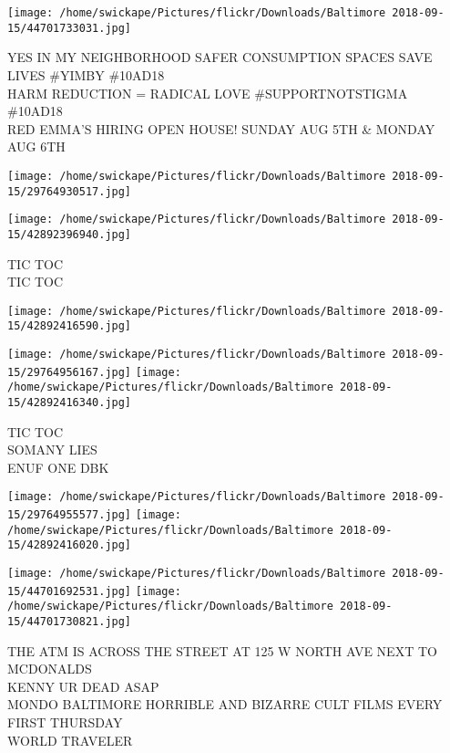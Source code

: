 \documentclass[10pt,letterpaper]{article}
\begin{document}
\texttt{[image: /home/swickape/Pictures/flickr/Downloads/Baltimore 2018-09-15/44701733031.jpg]}

YES IN MY NEIGHBORHOOD SAFER CONSUMPTION SPACES SAVE LIVES \#YIMBY \#10AD18\\
HARM REDUCTION = RADICAL LOVE \#SUPPORTNOTSTIGMA \#10AD18\\
RED EMMA'S HIRING OPEN HOUSE!   SUNDAY AUG 5TH \& MONDAY AUG 6TH\\
\pagebreak

\texttt{[image: /home/swickape/Pictures/flickr/Downloads/Baltimore 2018-09-15/29764930517.jpg]}

\vspace{0.25in}
\texttt{[image: /home/swickape/Pictures/flickr/Downloads/Baltimore 2018-09-15/42892396940.jpg]}

TIC TOC\\
TIC TOC\\
\pagebreak

\texttt{[image: /home/swickape/Pictures/flickr/Downloads/Baltimore 2018-09-15/42892416590.jpg]}

\vspace{0.25in}
\texttt{[image: /home/swickape/Pictures/flickr/Downloads/Baltimore 2018-09-15/29764956167.jpg]}
\texttt{[image: /home/swickape/Pictures/flickr/Downloads/Baltimore 2018-09-15/42892416340.jpg]}

TIC TOC\\
SOMANY LIES\\
ENUF ONE DBK\\
\pagebreak

\texttt{[image: /home/swickape/Pictures/flickr/Downloads/Baltimore 2018-09-15/29764955577.jpg]}
\texttt{[image: /home/swickape/Pictures/flickr/Downloads/Baltimore 2018-09-15/42892416020.jpg]}

\texttt{[image: /home/swickape/Pictures/flickr/Downloads/Baltimore 2018-09-15/44701692531.jpg]}
\texttt{[image: /home/swickape/Pictures/flickr/Downloads/Baltimore 2018-09-15/44701730821.jpg]}

THE ATM IS ACROSS THE STREET AT 125 W NORTH AVE NEXT TO MCDONALDS\\
KENNY UR DEAD ASAP\\
MONDO BALTIMORE HORRIBLE AND BIZARRE CULT FILMS EVERY FIRST THURSDAY\\
WORLD TRAVELER\\
\pagebreak
\end{document}
